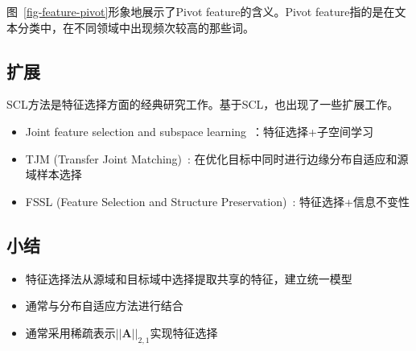 图~\ref{fig-feature-pivot}形象地展示了Pivot feature的含义。Pivot feature指的是在文本分类中，在不同领域中出现频次较高的那些词。


\subsection{扩展}

SCL方法是特征选择方面的经典研究工作。基于SCL，也出现了一些扩展工作。

\begin{itemize}
	\item Joint feature selection and subspace learning~\cite{gu2011joint}：特征选择+子空间学习
	\item TJM (Transfer Joint Matching)~\cite{long2014transfer}: 在优化目标中同时进行边缘分布自适应和源域样本选择
	\item FSSL (Feature Selection and Structure Preservation)~\cite{li2016joint}: 特征选择+信息不变性
\end{itemize}

\subsection{小结}

\begin{itemize}
	\item 特征选择法从源域和目标域中选择提取共享的特征，建立统一模型
	\item 通常与分布自适应方法进行结合
	\item 通常采用稀疏表示$||\mathbf{A}||_{2,1}$实现特征选择
\end{itemize}
